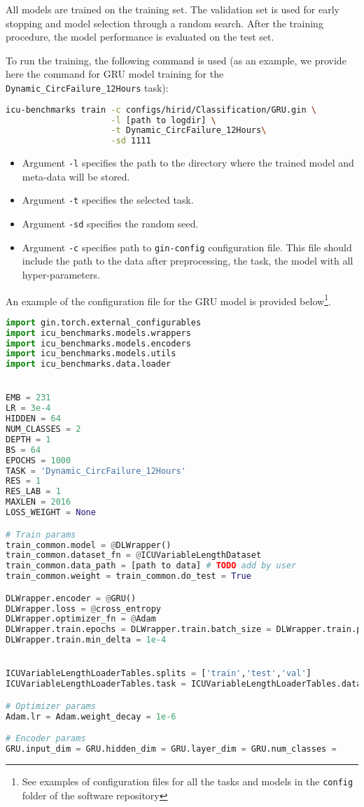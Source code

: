 \documentclass{article}
\begin{document}
All models are trained on the training set. The validation set is used for early stopping and model selection through a random search. After the training procedure, the model performance is evaluated on the test set.

To run the training, the following command is used (as an example, we provide here the command for GRU model training for the \texttt{Dynamic\_CircFailure\_12Hours} task):

\begin{lstlisting}[language=bash]
icu-benchmarks train -c configs/hirid/Classification/GRU.gin \
                     -l [path to logdir] \
                     -t Dynamic_CircFailure_12Hours\
                     -sd 1111 
\end{lstlisting}
\begin{itemize}
    \item Argument \texttt{-l} specifies the path to the directory where the trained model and meta-data will be stored.
    \item Argument \texttt{-t} specifies the selected task. 
    \item Argument \texttt{-sd} specifies the random seed.
    \item Argument \texttt{-c} specifies path to \texttt{gin-config} configuration file. This file should include the path to the data after preprocessing, the task, the model with all hyper-parameters. 
\end{itemize}

An example of the configuration file for the GRU model is provided below\footnote{See examples of configuration files for all the tasks and models in the \texttt{config} folder of the software repository}. 

\begin{lstlisting}[language=Python]
import gin.torch.external_configurables
import icu_benchmarks.models.wrappers
import icu_benchmarks.models.encoders
import icu_benchmarks.models.utils
import icu_benchmarks.data.loader


EMB = 231
LR = 3e-4
HIDDEN = 64
NUM_CLASSES = 2
DEPTH = 1
BS = 64
EPOCHS = 1000
TASK = 'Dynamic_CircFailure_12Hours'
RES = 1
RES_LAB = 1
MAXLEN = 2016
LOSS_WEIGHT = None

# Train params
train_common.model = @DLWrapper()
train_common.dataset_fn = @ICUVariableLengthDataset
train_common.data_path = [path to data] # TODO add by user
train_common.weight = train_common.do_test = True

DLWrapper.encoder = @GRU()
DLWrapper.loss = @cross_entropy
DLWrapper.optimizer_fn = @Adam
DLWrapper.train.epochs = DLWrapper.train.batch_size = DLWrapper.train.patience = 10
DLWrapper.train.min_delta = 1e-4


ICUVariableLengthLoaderTables.splits = ['train','test','val']
ICUVariableLengthLoaderTables.task = ICUVariableLengthLoaderTables.data_resampling = ICUVariableLengthLoaderTables.label_resampling = ICUVariableLengthDataset.maxlen = 

# Optimizer params
Adam.lr = Adam.weight_decay = 1e-6

# Encoder params
GRU.input_dim = GRU.hidden_dim = GRU.layer_dim = GRU.num_classes = \end{lstlisting}
\end{document}
